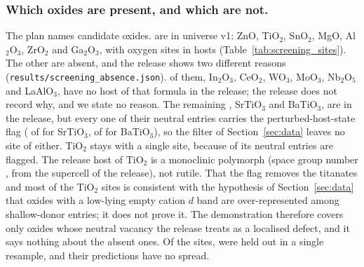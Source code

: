 \subsubsection{Which oxides are present, and which are not.}
The plan names \numScreeningDemoScopeNCandidates{} candidate oxides. \numScreeningDemoScopeNPresent{} are in universe v1: ZnO, TiO$_2$, SnO$_2$, MgO, Al$_2$O$_3$, ZrO$_2$ and Ga$_2$O$_3$, with \numScreeningDemoScopeNScreenedSites{} oxygen sites in \numScreeningDemoScopeNHosts{} hosts (Table~\ref{tab:screening_sites}). The other \numScreeningDemoScopeNAbsent{} are absent, and the release shows two different reasons (\texttt{results/screening\_absence.json}). \numScreeningDemoScopeNNotInRelease{} of them, In$_2$O$_3$, CeO$_2$, WO$_3$, MoO$_3$, Nb$_2$O$_5$ and LaAlO$_3$, have no host of that formula in the release; the release does not record why, and we state no reason. The remaining \numScreeningDemoScopeNPhsRemoved{}, SrTiO$_3$ and BaTiO$_3$, are in the release, but every one of their neutral entries carries the perturbed-host-state flag (\numScreeningDemoScopePhsRemovedSrTiOThreePhsEntries{} of \numScreeningDemoScopePhsRemovedSrTiOThreeNeutralEntries{} for SrTiO$_3$, \numScreeningDemoScopePhsRemovedBaTiOThreePhsEntries{} of \numScreeningDemoScopePhsRemovedBaTiOThreeNeutralEntries{} for BaTiO$_3$), so the filter of Section~\ref{sec:data} leaves no site of either. TiO$_2$ stays with a single site, because \numScreeningDemoScopeTioTwoReleasePhsEntries{} of its \numScreeningDemoScopeTioTwoReleaseNeutralEntries{} neutral entries are flagged. The release host of TiO$_2$ is a monoclinic polymorph (space group number \numScreeningDemoHostsTiOTwoSpaceGroupNumber{}, from the supercell of the release), not rutile. That the flag removes the titanates and most of the TiO$_2$ sites is consistent with the hypothesis of Section~\ref{sec:data} that oxides with a low-lying empty cation $d$ band are over-represented among shallow-donor entries; it does not prove it. The demonstration therefore covers only oxides whose neutral vacancy the release treats as a localised defect, and it says nothing about the absent ones. Of the \numScreeningDemoScopeNScreenedSites{} sites, \numScreeningDemoScopeNSitesOneResample{} were held out in a single resample, and their predictions have no spread.


